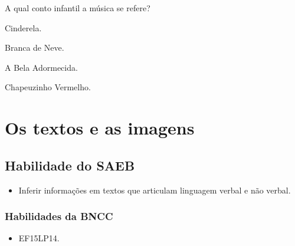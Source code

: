 
A qual conto infantil a música se refere?

\begin{escolha}
\item Cinderela.

\item Branca de Neve.

\item A Bela Adormecida.

\item Chapeuzinho Vermelho.
\end{escolha}


\chapter{Os textos e as imagens}

\section*{Habilidade do SAEB}

\begin{itemize}
\item
Inferir informações em textos que articulam linguagem verbal e não verbal.
\end{itemize}

\subsection{Habilidades da BNCC}

\begin{itemize}
\item EF15LP14.
\end{itemize}


